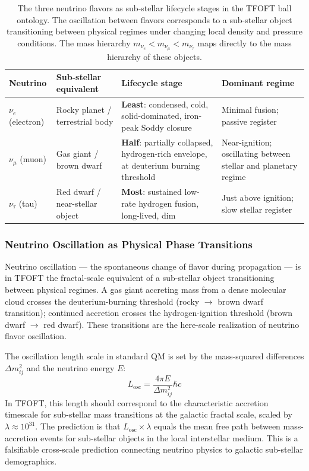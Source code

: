   \begin{table}[h]
  \centering
  \begin{tabular}{|l|p{3.2cm}|p{3.2cm}|p{3cm}|}
  \hline
  \textbf{Neutrino} & \textbf{Sub-stellar equivalent} & \textbf{Lifecycle stage}
    & \textbf{Dominant regime} \\
  \hline
  $\nu_e$ (electron) & Rocky planet / terrestrial body
    & \textbf{Least}: condensed, cold, solid-dominated, iron-peak Soddy closure
    & Minimal fusion; passive register \\
  \hline
  $\nu_\mu$ (muon) & Gas giant / brown dwarf
    & \textbf{Half}: partially collapsed, hydrogen-rich envelope, at deuterium burning threshold
    & Near-ignition; oscillating between stellar and planetary regime \\
  \hline
  $\nu_\tau$ (tau) & Red dwarf / near-stellar object
    & \textbf{Most}: sustained low-rate hydrogen fusion, long-lived, dim
    & Just above ignition; slow stellar register \\
  \hline
  \end{tabular}
  \caption{The three neutrino flavors as sub-stellar lifecycle stages in the TFOFT
  ball ontology. The oscillation between flavors corresponds to a sub-stellar object
  transitioning between physical regimes under changing local density and pressure
  conditions. The mass hierarchy $m_{\nu_e} < m_{\nu_\mu} < m_{\nu_\tau}$ maps
  directly to the mass hierarchy of these objects.}
  \end{table}

  \subsubsection{Neutrino Oscillation as Physical Phase Transitions}

    Neutrino oscillation --- the spontaneous change of flavor during propagation ---
    is in TFOFT the fractal-scale equivalent of a sub-stellar object transitioning
    between physical regimes. A gas giant accreting mass from a dense molecular cloud
    crosses the deuterium-burning threshold (rocky $\to$ brown dwarf transition);
    continued accretion crosses the hydrogen-ignition threshold (brown dwarf $\to$
    red dwarf). These transitions are the here-scale realization of neutrino flavor
    oscillation.

    The oscillation length scale in standard QM is set by the mass-squared differences
    $\Delta m^2_{ij}$ and the neutrino energy $E$:
    \[
      L_{\text{osc}} = \frac{4\pi E}{\Delta m^2_{ij}} \hbar c
    \]
    In TFOFT, this length should correspond to the characteristic accretion timescale
    for sub-stellar mass transitions at the galactic fractal scale, scaled by $\lambda
    \approx 10^{31}$. The prediction is that $L_{\text{osc}} \times \lambda$ equals the
    mean free path between mass-accretion events for sub-stellar objects in the local
    interstellar medium. This is a falsifiable cross-scale prediction connecting
    neutrino physics to galactic sub-stellar demographics.

